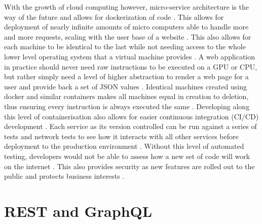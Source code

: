 \newline
\newline
With the growth of cloud computing however, micro-service architecture is the way of the future and allows for dockerization of code \cite{Combe_Martin_Di_Pietro_2016}. This allows for deployment of nearly infinite amounts of micro computers able to handle more and more requests, scaling with the user base of a website \cite{Combe_Martin_Di_Pietro_2016}. This also allows for each machine to be identical to the last while not needing access to the whole lower level operating system that a virtual machine provides \cite{Combe_Martin_Di_Pietro_2016}. A web application in practice should never need raw instructions to be executed on a GPU or CPU, but rather simply need a level of higher abstraction to render a web page for a user and provide back a set of JSON values \cite{Combe_Martin_Di_Pietro_2016}. Identical machines created using docker and similar containers makes all machines equal in creation to deletion, thus ensuring every instruction is always executed the same \cite{Combe_Martin_Di_Pietro_2016}.
\newline
\newline
Developing along this level of containerisation also allows for easier continuous integration (CI/CD) development \cite{Stolberg_2009, Red_Hat_Devops_2022}. Each service as its version controlled can be run against a series of tests and network tests to see how it interacts with all other services before deployment to the production environment \cite{Red_Hat_Devops_2022}. Without this level of automated testing, developers would not be able to assess how a new set of code will work on the internet \cite{Stolberg_2009}. This also provides security as new features are rolled out to the public and protects business interests \cite{Combe_Martin_Di_Pietro_2016}.

\section{REST and GraphQL}

